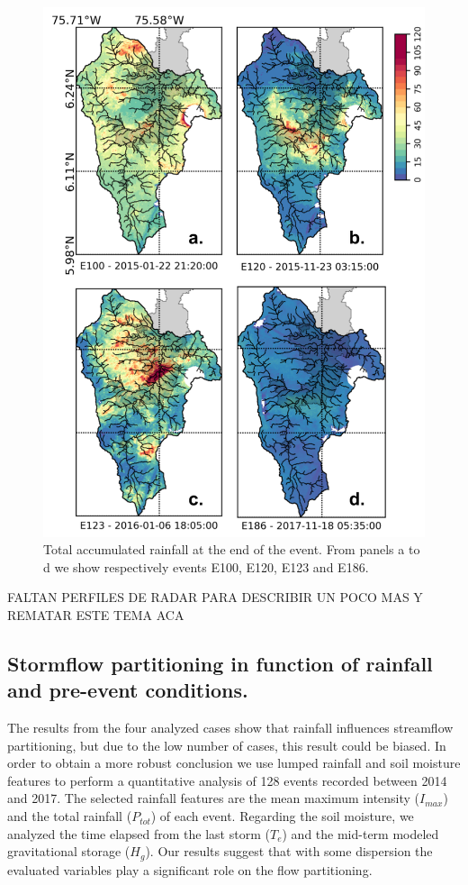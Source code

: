 \documentclass[preprint,12pt]{elsarticle}
\begin{document}
\begin{figure}[!h]
    \centering
    \includegraphics[width=14cm]{Figuras/Rainfall_accumulation.png}
    \caption{Total accumulated rainfall at the end of the event.  From panels a to d we show respectively events E100, E120, E123 and E186.}
    \label{fig:rainfall_acum}
\end{figure}

FALTAN PERFILES DE RADAR PARA DESCRIBIR UN POCO MAS Y REMATAR ESTE TEMA ACA 

\subsection{Stormflow partitioning in function of rainfall and pre-event conditions.}

The results from the four analyzed cases show that rainfall influences streamflow partitioning, but due to the low number of cases, this result could be biased.   In order to obtain a more robust conclusion we use lumped rainfall and soil moisture features to perform a quantitative analysis of 128 events recorded between 2014 and 2017. The selected rainfall features are the mean maximum intensity ($I_{max}$) and the total rainfall ($P_{tot}$) of each event.  Regarding the soil moisture, we analyzed the time elapsed from the last storm ($T_e$) and the mid-term modeled gravitational storage ($H_g$).  Our results suggest that with some dispersion the evaluated variables play a significant role on the flow partitioning.\\   
\end{document}
